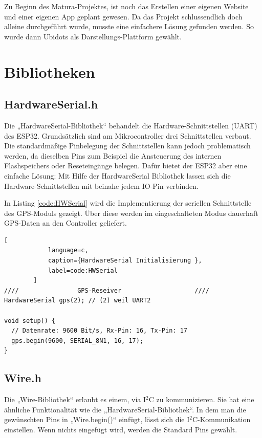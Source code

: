     Zu Beginn des Matura-Projektes, ist noch das Erstellen einer eigenen Website und einer eigenen App geplant gewesen. Da das Projekt schlussendlich doch alleine durchgeführt wurde, musste eine einfachere Lösung gefunden werden. So wurde dann Ubidots als Darstellungs-Plattform gewählt. 

\pagebreak

\section{Bibliotheken}
    \subsection{HardwareSerial.h}
    
        Die „HardwareSerial-Bibliothek“ behandelt die Hardware-Schnittstellen (UART) des ESP32. Grundsätzlich sind am Mikrocontroller drei Schnittstellen verbaut. Die standardmäßige Pinbelegung der Schnittstellen kann jedoch problematisch werden, da dieselben Pins zum Beispiel die Ansteuerung des internen Flashspeichers oder Reseteingänge belegen. Dafür bietet der ESP32 aber eine einfache Lösung: Mit Hilfe der HardwareSerial Bibliothek lassen sich die Hardware-Schnittstellen mit beinahe jedem IO-Pin verbinden.
        \begin{flushright}
            \cite{bib:HWSerial}
        \end{flushright}
        
        In Listing \ref{code:HWSerial} wird die Implementierung der seriellen Schnittstelle des GPS-Moduls gezeigt. Über diese werden im eingeschalteten Modus dauerhaft GPS-Daten an den Controller geliefert. 
        \begin{lstlisting}[
            language=c,
            caption={HardwareSerial Initialisierung },
            label=code:HWSerial
        ]
////                GPS-Reseiver                    ////
HardwareSerial gps(2); // (2) weil UART2

void setup() {
  // Datenrate: 9600 Bit/s, Rx-Pin: 16, Tx-Pin: 17
  gps.begin(9600, SERIAL_8N1, 16, 17); 
}
        \end{lstlisting}
    
    \subsection{Wire.h}
        Die „Wire-Bibliothek“ erlaubt es einem, via I$^2$C zu kommunizieren. Sie hat eine ähnliche Funktionalität wie die „HardwareSerial-Bibliothek“. In dem man die gewünschten Pins in „Wire.begin()“ einfügt, lässt sich die I$^2$C-Kommunikation einstellen. Wenn nichts eingefügt wird, werden die Standard Pins gewählt. 
        

